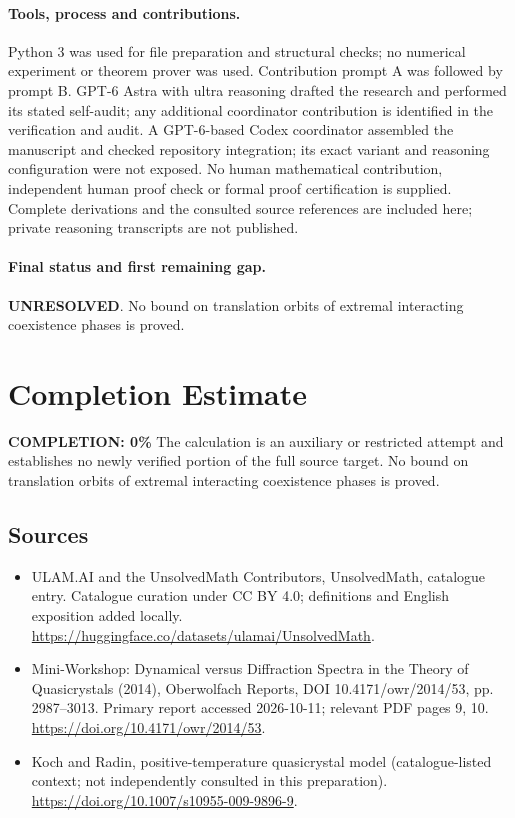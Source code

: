 \documentclass[11pt]{article}
\begin{document}
\paragraph{Tools, process and contributions.}
Python 3 was used for file preparation and structural checks; no numerical experiment or theorem prover was used. Contribution prompt A was followed by prompt B. GPT-6 Astra with ultra reasoning drafted the research and performed its stated self-audit; any additional coordinator contribution is identified in the verification and audit. A GPT-6-based Codex coordinator assembled the manuscript and checked repository integration; its exact variant and reasoning configuration were not exposed. No human mathematical contribution, independent human proof check or formal proof certification is supplied. Complete derivations and the consulted source references are included here; private reasoning transcripts are not published.

\paragraph{Final status and first remaining gap.}
\textbf{UNRESOLVED}. No bound on translation orbits of extremal interacting coexistence phases is proved.

\section{Completion Estimate}
\noindent\textbf{COMPLETION: 0\%}
The calculation is an auxiliary or restricted attempt and establishes no newly verified portion of the full source target. No bound on translation orbits of extremal interacting coexistence phases is proved.

\subsection{Sources}
\begin{itemize}
\item[\hypertarget{source:statement:1}{S1}] ULAM.AI and the UnsolvedMath Contributors, UnsolvedMath, catalogue entry. Catalogue curation under CC BY 4.0; definitions and English exposition added locally.
\url{https://huggingface.co/datasets/ulamai/UnsolvedMath}.
\item[\hypertarget{source:statement:2}{S2}] Mini-Workshop: Dynamical versus Diffraction Spectra in the Theory of Quasicrystals (2014), Oberwolfach Reports, DOI 10.4171/owr/2014/53, pp. 2987--3013. Primary report accessed 2026-10-11; relevant PDF pages 9, 10.
\url{https://doi.org/10.4171/owr/2014/53}.
\item[\hypertarget{source:statement:3}{S3}] Koch and Radin, positive-temperature quasicrystal model (catalogue-listed context; not independently consulted in this preparation).
\url{https://doi.org/10.1007/s10955-009-9896-9}.
\end{itemize}
\label{end:statement}
\end{document}
